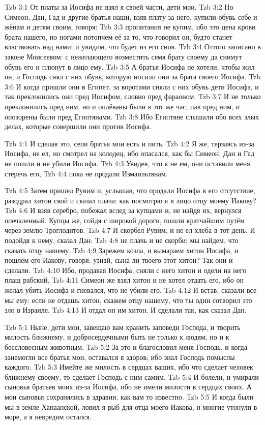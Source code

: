 \vs Tzb 3:1
От платы за Иосифа не взял я своей части, дети мои.
\vs Tzb 3:2
Но Симеон, Дан, Гад и другие братья наши,
взяв плату за него, купили обувь себе и жёнам и детям своим,
говоря:
\vs Tzb 3:3
пропитания не купим, ибо это цена крови брата нашего,
но ногами потопчем её за то, что говорил он,
будто станет властвовать над нами;
и увидим, что будет из его снов.
\vs Tzb 3:4
Оттого записано в законе Моисеевом:
с нежелающего возместить семя брату своему
да снимут обувь его и плюнут в лицо ему.
\vs Tzb 3:5
А братья Иосифа не хотели, чтобы жил он,
и Господь снял с них обувь,
которую носили они за брата своего Иосифа.
\vs Tzb 3:6
И когда пришли они в Египет, за воротами сняли с них
обувь дети Иосифа,
и так преклонились они пред Иосифом, словно пред фараоном.
\vs Tzb 3:7
И не только преклонились пред ним,
но и оплёваны были в тот же час,
пав пред ним, и опозорены были пред Египтянами.
\vs Tzb 3:8
Ибо Египтяне слышали обо всех злых делах,
которые совершили они против Иосифа.

\vs Tzb 4:1
И сделав это, сели братья мои есть и пить.
\vs Tzb 4:2
Я же, терзаясь из-за Иосифа, не ел,
но смотрел на колодец, ибо опасался,
как бы Симеон, Дан и Гад не пошли и не убили Иосифа.
\vs Tzb 4:3
Увидев, что я не ем, они оставили меня стеречь его,
\vs Tzb 4:4
пока не продали Измаильтянам.

\vs Tzb 4:5
Затем пришел Рувим и, услышав,
что продали Иосифа в его отсутствие,
разодрал хитон свой и сказал плача:
как посмотрю я в лицо отцу моему Иакову?
\vs Tzb 4:6
И взяв серебро,
побежал вслед за купцами и, не найдя их,
вернулся опечаленный.
Купцы же, сойдя с широкой дороги,
пошли кратчайшим путём через землю Троглодитов.
\vs Tzb 4:7
И скорбел Рувим, и не ел хлеба в тот день.
И подойдя к нему, сказал Дан:
\vs Tzb 4:8
не плачь и не скорби; мы найдем, что сказать отцу нашему.
\vs Tzb 4:9
Зарежем козла, и вымараем хитон Иосифа,
и пошлём его Иакову, говоря:
узнай, сына ли твоего этот хитон?
Так они и сделали.
\vs Tzb 4:10
Ибо, продавая Иосифа, сняли с него хитон и одели на него плащ рабский.
\vs Tzb 4:11
Симеон же взял хитон и не хотел отдать его, ибо он желал убить Иосифа
и гневался, что не убили его.
\vs Tzb 4:12
И встав, сказали все мы ему:
если не отдашь хитон, скажем отцу нашему,
что ты один сотворил это зло в Израиле.
\vs Tzb 4:13
И отдал он им хитон. И сделали так, как сказал Дан.

\vs Tzb 5:1
Ныне, дети мои, завещаю вам хранить заповеди Господа,
и творить милость ближнему,
и добросердечными быть не только к людям,
но и к бессловесным животным.
\vs Tzb 5:2
За это и благословил меня Господь,
и когда занемогли все братья мои,
оставался я здоров; ибо знал Господь помыслы каждого.
\vs Tzb 5:3
Имейте же милость в сердцах ваших, ибо что сделает человек ближнему
своему, то сделает Господь с ним самим.
\vs Tzb 5:4
И болели, и умирали сыновья братьев моих из-за Иосифа,
ибо не имели милости в сердцах своих.
А мои сыновья сохранялись в здравии,
как вам то известно.
\vs Tzb 5:5
И когда были мы в земле Ханаанской,
ловил я рыб для отца моего Иакова,
и многие утонули в море,
а я невредим остался.

